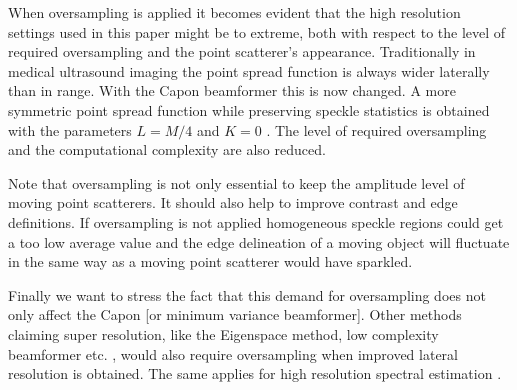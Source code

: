 \documentclass[draftcls]{IEEEtran}
\begin{document}
When oversampling is applied it becomes evident that the high resolution settings used in this paper might be to extreme, both with respect to the level of required oversampling and the point scatterer's appearance. Traditionally in medical ultrasound imaging the point spread function is always wider laterally than in range. With the Capon beamformer this is now changed. A more symmetric point spread function while preserving speckle statistics is obtained with the parameters $L=M/4$ and $K=0$ \cite{Synnevag2007a}. The level of required oversampling and the computational complexity are also reduced. %

Note that oversampling is not only essential to keep the amplitude level of moving point scatterers. It should also help to improve contrast and edge definitions. If oversampling is not applied homogeneous speckle regions could get a too low average value and the edge delineation of a moving object will fluctuate in the same way as a moving point scatterer would have sparkled.

Finally we want to stress the fact that this demand for oversampling does not only affect the Capon [or minimum variance beamformer]. Other methods claiming super resolution, like the Eigenspace method, low complexity beamformer etc. \cite{Synnevag2011, Nilsen2009, Mehdizadeh2012a, Kim}, would also require oversampling when improved lateral resolution is obtained. The same applies for high resolution spectral estimation \cite{Ekroll2012}.


\end{document}
